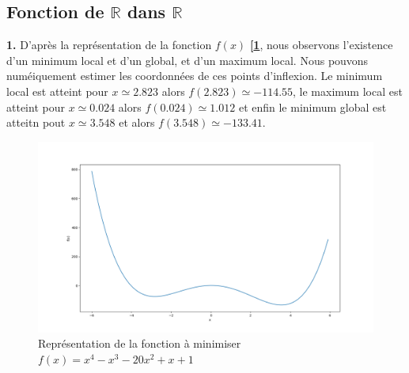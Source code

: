\documentclass[12pt]{article}
\begin{document}
\subsection{Fonction de $\mathbb{R}$ dans $\mathbb{R}$}
\begin{minipage}{0.5\textwidth}

\textbf{\color{brick}1.} 
D'après la représentation de la fonction $f(x)$ \textbf{[\ref{Q1}}, nous observons l'existence d'un minimum local et d'un global, et d'un maximum local. Nous pouvons numéiquement estimer les coordonnées de ces points d'inflexion. Le minimum local est atteint pour $x\simeq 2.823$ alors $f(2.823)\simeq -114.55$, le maximum local est atteint pour $x\simeq0.024$ alors $f(0.024)\simeq 1.012$ et enfin le minimum global est atteitn pout $x\simeq 3.548$ et alors $f(3.548)\simeq -133.41$.
\end{minipage} \hfill
\begin{minipage}{0.45\textwidth}
\begin{figure}[H]
\includegraphics[width=1\textwidth]{Q1.png}
\caption{Représentation de la fonction à minimiser  $f(x)=x^4 - x^3 -20x^2+x+1$}
\label{Q1}
\end{figure}
\end{minipage}
\end{document}
